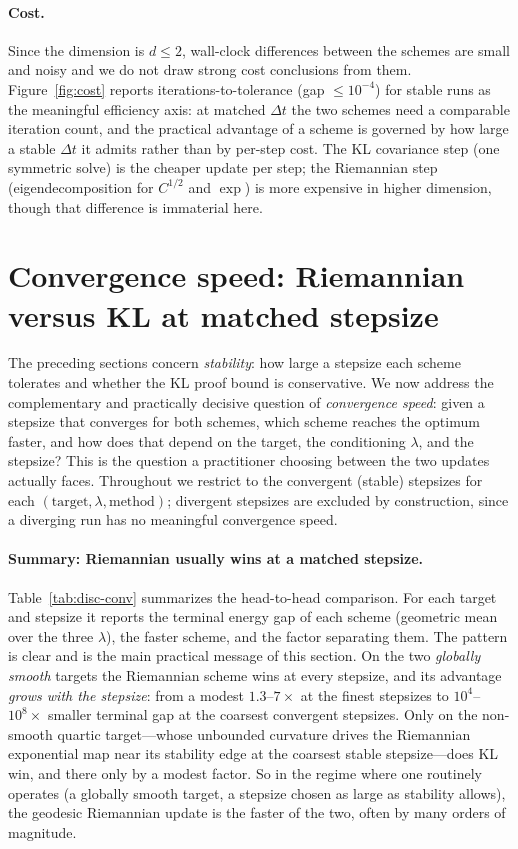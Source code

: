 \documentclass[11pt]{article}
\begin{document}
\paragraph{Cost.}
Since the dimension is $d\le2$, wall-clock differences between the schemes are
small and noisy and we do not draw strong cost conclusions from them.
Figure~\ref{fig:cost} reports iterations-to-tolerance (gap $\le10^{-4}$) for stable
runs as the meaningful efficiency axis: at matched $\Delta t$ the two schemes need
a comparable iteration count, and the practical advantage of a scheme is governed
by how large a stable $\Delta t$ it admits rather than by per-step cost. The KL
covariance step (one symmetric solve) is the cheaper update per step; the
Riemannian step (eigendecomposition for $C^{1/2}$ and $\exp$) is more expensive in
higher dimension, though that difference is immaterial here.

\section{Convergence speed: Riemannian versus KL at matched stepsize}\label{app:speed}

The preceding sections concern \emph{stability}: how large a stepsize each
scheme tolerates and whether the KL proof bound is conservative. We now address
the complementary and practically decisive question of \emph{convergence speed}:
given a stepsize that converges for both schemes, which scheme reaches the
optimum faster, and how does that depend on the target, the conditioning
$\lambda$, and the stepsize? This is the question a practitioner choosing between
the two updates actually faces. Throughout we restrict to the convergent (stable)
stepsizes for each $(\text{target},\lambda,\text{method})$; divergent stepsizes
are excluded by construction, since a diverging run has no meaningful convergence
speed.

\paragraph{Summary: Riemannian usually wins at a matched stepsize.}
Table~\ref{tab:disc-conv} summarizes the head-to-head comparison. For each target
and stepsize it reports the terminal energy gap of each scheme (geometric mean
over the three $\lambda$), the faster scheme, and the factor separating them. The
pattern is clear and is the main practical message of this section. On the two
\emph{globally smooth} targets the Riemannian scheme wins at every stepsize, and
its advantage \emph{grows with the stepsize}: from a modest $1.3$--$7\times$ at the
finest stepsizes to $10^{4}$--$10^{8}\times$ smaller terminal gap at the coarsest
convergent stepsizes. Only on the non-smooth quartic target---whose unbounded
curvature drives the Riemannian exponential map near its stability edge at the
coarsest stable stepsize---does KL win, and there only by a modest factor. So in
the regime where one routinely operates (a globally smooth target, a stepsize
chosen as large as stability allows), the geodesic Riemannian update is the
faster of the two, often by many orders of magnitude.
\end{document}
